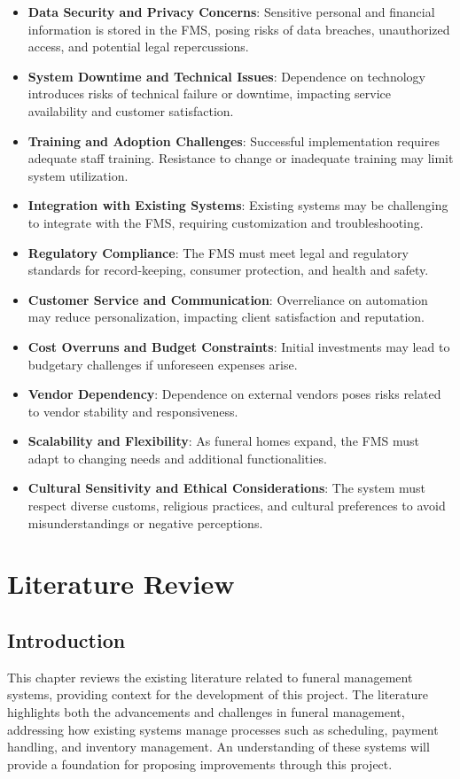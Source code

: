 \documentclass[a4paper,12pt]{report}
\begin{document}
\begin{itemize}
    \item \textbf{Data Security and Privacy Concerns}: Sensitive personal and financial information is stored in the FMS, posing risks of data breaches, unauthorized access, and potential legal repercussions.
    \item \textbf{System Downtime and Technical Issues}: Dependence on technology introduces risks of technical failure or downtime, impacting service availability and customer satisfaction.
    \item \textbf{Training and Adoption Challenges}: Successful implementation requires adequate staff training. Resistance to change or inadequate training may limit system utilization.
    \item \textbf{Integration with Existing Systems}: Existing systems may be challenging to integrate with the FMS, requiring customization and troubleshooting.
    \item \textbf{Regulatory Compliance}: The FMS must meet legal and regulatory standards for record-keeping, consumer protection, and health and safety.
    \item \textbf{Customer Service and Communication}: Overreliance on automation may reduce personalization, impacting client satisfaction and reputation.
    \item \textbf{Cost Overruns and Budget Constraints}: Initial investments may lead to budgetary challenges if unforeseen expenses arise.
    \item \textbf{Vendor Dependency}: Dependence on external vendors poses risks related to vendor stability and responsiveness.
    \item \textbf{Scalability and Flexibility}: As funeral homes expand, the FMS must adapt to changing needs and additional functionalities.
    \item \textbf{Cultural Sensitivity and Ethical Considerations}: The system must respect diverse customs, religious practices, and cultural preferences to avoid misunderstandings or negative perceptions.
\end{itemize}

\newpage
\chapter{Literature Review}

\section{Introduction}
This chapter reviews the existing literature related to funeral management systems, providing context for the development of this project. The literature highlights both the advancements and challenges in funeral management, addressing how existing systems manage processes such as scheduling, payment handling, and inventory management. An understanding of these systems will provide a foundation for proposing improvements through this project.
\end{document}
